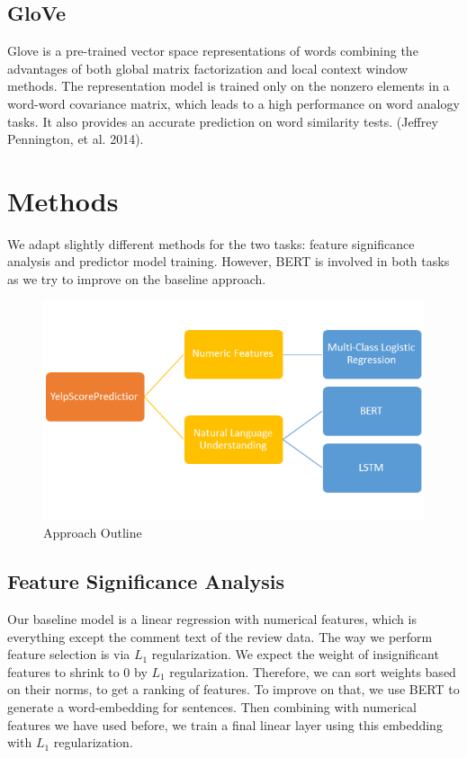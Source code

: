 \documentclass{article}
\begin{document}
\subsection{GloVe}
Glove is a pre-trained vector space representations of words combining the advantages of both global matrix factorization and local context window methods. The representation model is trained only on the nonzero elements in a word-word covariance matrix, which leads to a high performance on word analogy tasks. It also provides an accurate prediction on word similarity tests. (Jeffrey Pennington, et al. 2014)\cite{4}.

\section{Methods}
We adapt slightly different methods for the two tasks: feature significance analysis and predictor model training. However, BERT is involved in both tasks as we try to improve on the baseline approach. \\

\begin{figure}
\begin{center}
\includegraphics[scale=0.5]{approach_outline}
\caption{Approach Outline}
\end{center}

\end{figure}






\subsection{Feature Significance Analysis}
Our baseline model is a linear regression with numerical features, which is everything except the comment text of the review data. The way we perform feature selection is via $L_1$ regularization. We expect the weight of insignificant features to shrink to 0 by $L_1$ regularization. Therefore, we can sort weights based on their norms, to get a ranking of features. To improve on that, we use BERT to generate a word-embedding for sentences. Then combining with numerical features we have used before, we train a final linear layer using this embedding with $L_1$ regularization.
\end{document}
